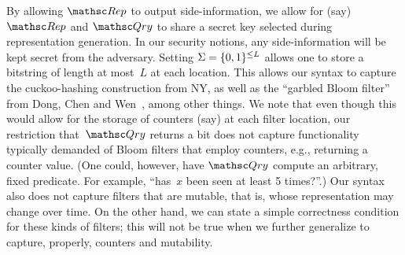 By allowing $\Rep$ to output side-information, we allow for (say) $\Rep$ and $\Qry$ to share a secret key selected during representation generation.  In our security notions, any side-information will be kept secret from the adversary.
%
Setting $\Sigma=\{0,1\}^{\leq L}$ allows one to store a bitstring of length at most~$L$ at each location.  This allows our syntax to capture the cuckoo-hashing construction from NY, as well as the ``garbled Bloom filter'' from Dong, Chen and Wen~\cite{xxx}, among other things. We note that even though this would allow for the storage of counters (say) at each filter location, our restriction that~$\Qry$ returns a bit does not capture functionality typically demanded of Bloom filters that employ counters, e.g., returning a counter value. (One could, however, have $\Qry$ compute an arbitrary, fixed predicate.  For example, ``has~$x$ been seen at least 5 times?''.) Our syntax also does not capture filters that are mutable, that is, whose representation may change over time. On the other hand, we can state a simple correctness condition for these kinds of filters; this will not be true when we further generalize to capture, properly, counters and mutability.
